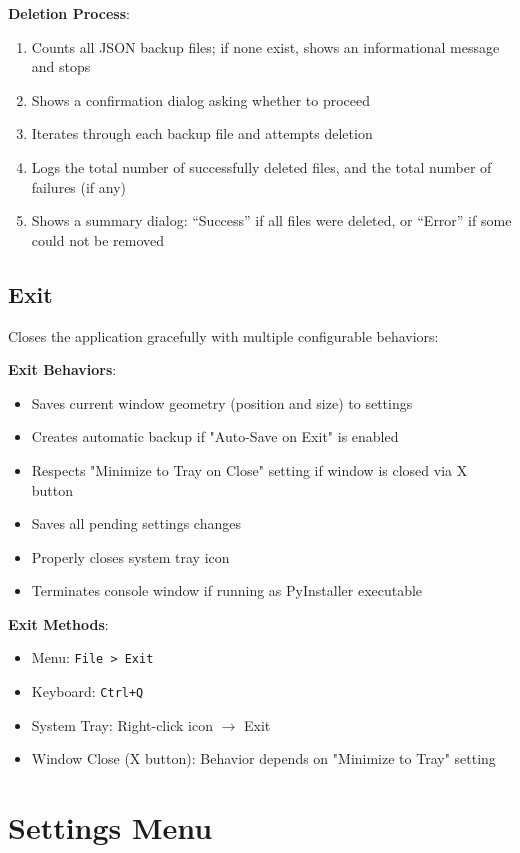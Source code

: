 \documentclass[a4paper,11pt]{article}
\begin{document}
\textbf{Deletion Process}:
\begin{enumerate}
  \item Counts all JSON backup files; if none exist, shows an
    informational message and stops
  \item Shows a confirmation dialog asking whether to proceed
  \item Iterates through each backup file and attempts deletion
  \item Logs the total number of successfully deleted files, and
    the total number of failures (if any)
  \item Shows a summary dialog: ``Success'' if all files were deleted,
    or ``Error'' if some could not be removed
\end{enumerate}

\subsection{Exit}

Closes the application gracefully with multiple configurable behaviors:

\textbf{Exit Behaviors}:
\begin{itemize}
  \item Saves current window geometry (position and size) to settings
  \item Creates automatic backup if "Auto-Save on Exit" is enabled
  \item Respects "Minimize to Tray on Close" setting if window is
    closed via X button
  \item Saves all pending settings changes
  \item Properly closes system tray icon
  \item Terminates console window if running as PyInstaller executable
\end{itemize}

\textbf{Exit Methods}:
\begin{itemize}
  \item Menu: \texttt{File > Exit}
  \item Keyboard: \texttt{Ctrl+Q}
  \item System Tray: Right-click icon $\rightarrow$ Exit
  \item Window Close (X button): Behavior depends on "Minimize to Tray" setting
\end{itemize}

\section{Settings Menu}
\end{document}

